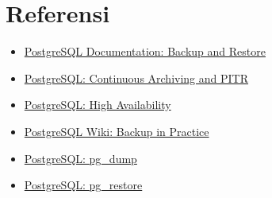 \section{Referensi}

\begin{itemize}
    \item \href{https://www.postgresql.org/docs/current/backup.html}{PostgreSQL Documentation: Backup and Restore}
    \item \href{https://www.postgresql.org/docs/current/continuous-archiving.html}{PostgreSQL: Continuous Archiving and PITR}
    \item \href{https://www.postgresql.org/docs/current/high-availability.html}{PostgreSQL: High Availability}
    \item \href{https://wiki.postgresql.org/wiki/Backup_in_practice}{PostgreSQL Wiki: Backup in Practice}
    \item \href{https://www.postgresql.org/docs/current/app-pgdump.html}{PostgreSQL: pg\_dump}
    \item \href{https://www.postgresql.org/docs/current/app-pgrestore.html}{PostgreSQL: pg\_restore}
\end{itemize}